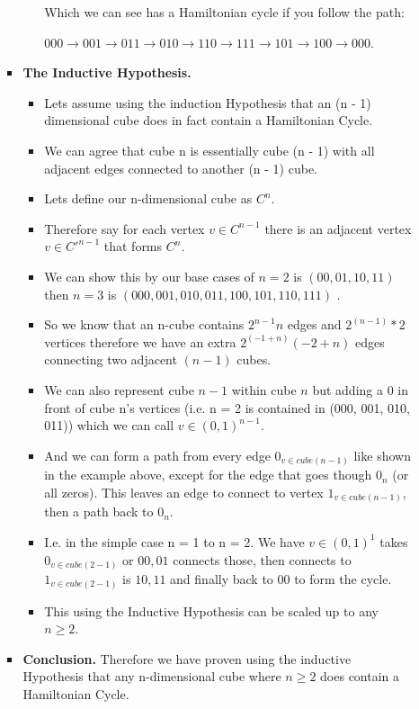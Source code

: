 \documentclass{article}
\begin{document}
\begin{enumerate}
\begin{enumerate}
\begin{itemize}
\begin{itemize}
            Which we can see has a Hamiltonian cycle if you follow the path:
            
            ${000 \rightarrow 001 \rightarrow 011 \rightarrow 010 \rightarrow 110 \rightarrow 111 \rightarrow 101 \rightarrow 100 \rightarrow 000}$.
          \end{itemize}
          \item \textbf{The Inductive Hypothesis.}
          \begin{itemize}
            \item Lets assume using the induction Hypothesis that an (n - 1) dimensional cube does in fact contain a Hamiltonian Cycle.
            \item We can agree that cube n is essentially cube (n - 1) with all adjacent edges connected to another (n - 1) cube.
            \item Lets define our n-dimensional cube as $C^n$.
            \item Therefore say for each vertex $v \in C^{n - 1}$ there is an adjacent vertex $v \in C'^{n - 1}$ that forms $C^n$.
            \item We can show this by our base cases of $n = 2$ is $(00, 01, 10, 11)$ then $n = 3$ is $(000, 001, 010, 011, 100, 101, 110, 111)$ .
            \item So we know that an n-cube contains $2^{n−1}n$ edges and $2^(n - 1) * 2$ vertices therefore we have an extra $2^{(-1 + n)} (-2 + n)$ edges connecting two adjacent $(n - 1)$ cubes. 
            \item We can also represent cube $n - 1$ within cube $n$ but adding a 0 in front of cube n's vertices (i.e. n = 2 is contained in (000, 001, 010, 011)) which we can call $v \in (0,1)^{n-1}$.
            \item And we can form a path from every edge $0_{v \in cube(n - 1)}$ like shown in the example above, except for the edge that goes though $0_n$ (or all zeros). This leaves an edge to connect to vertex $1_{v \in cube(n - 1)}$, then a path back to $0_n$.
            \item I.e. in the simple case n = 1 to n = 2. We have $v \in (0, 1)^1$ takes $0_{v \in cube(2 - 1)}$ or $00, 01$ connects those, then connects to $1_{v \in cube(2 - 1)}$ is $10, 11$ and finally back to $00$ to form the cycle.
            \item This using the Inductive Hypothesis can be scaled up to any $n \geq 2$. 
        \end{itemize}
        \item \textbf{Conclusion.}        
        Therefore we have proven using the inductive Hypothesis that any n-dimensional cube where $n \ge 2$ does contain a Hamiltonian Cycle.
      \end{itemize}
    \end{enumerate}


\end{enumerate}
\end{document}
